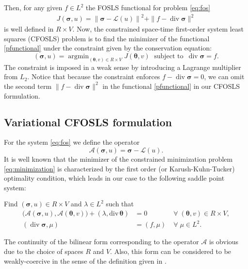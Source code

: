 \documentclass[a4paper,12pt]{amsart}
\numberwithin{equation}{section}
\renewcommand{\div}{\operatorname{div}}
\newcommand{\A}{{\mathcal A}}
\renewcommand{\L}{{\mathcal L}}
\def\btheta{{\boldsymbol \theta}}
\def\bsigma{{\boldsymbol \sigma}}
\newcommand{\om}{\Omega}
\DeclareMathOperator*{\argmin}{argmin}
\begin{document}
Then, for any given $f\in L^2$ the FOSLS functional for problem \eqref{eq:fos} 
\begin{align}
J(\bsigma, u) = \left\| \bsigma - \L(u) \right\|^2 + \| f-\div \bsigma \| ^2 \label{pfunctional}
\end{align} 
is well defined in $R \times V$.
Now, the constrained space-time first-order system least squares (CFOSLS) problem is to find the minimizer of the functional \eqref{pfunctional} 
under the constraint given by the conservation equation:
\begin{equation}
(\bsigma, u) = \argmin_{(\btheta, v)\in R\times V} J(\btheta, v) \;\text{ subject to } \, \div \bsigma = f. 
\label{eq:minimization}
\end{equation}
The constraint is imposed in a weak sense by introducing a Lagrange multiplier from $L_2$. Notice that because the constraint enforces $f-\div \bsigma = 0$, we can omit the second term $\| f-\div \bsigma \| ^2$ in the functional \eqref{pfunctional} in our CFOSLS formulation.


\subsection{Variational CFOSLS formulation} 
For the system \eqref{eq:fos} we define the operator
\[ 
\A(\bsigma, u ) = \bsigma -\L(u).
\]
It is well known that the minimizer of the constrained minimization problem \eqref{eq:minimization} is characterized by the first order (or Karush-Kuhn-Tucker) optimality condition, which leads in our case to the following saddle point system: 

Find $(\bsigma, u) \in R\times V$ and $\lambda \in L^2$ such that 
\begin{equation}
\begin{array}{lll}
\big(\A(\bsigma, u), \A(\btheta, v) \big) + (\lambda, \mathrm{div}\,  \btheta) & = 0  & \;\forall\; (\btheta, v) \in R\times V,     \\
( \div  \bsigma,\mu )  &= (f, \mu) &  \;\forall\;  \mu\in L^2.
\end{array}
\label{eq:kkt_system}
\end{equation} 

The continuity of the bilinear form corresponding to the operator $\A$ is obvious due to the choice of spaces $R$ and $V$. Also, this form can be considered to be weakly-coercive in the sense of the definition given in \cite{AdlerVassilevski}.
\end{document}
